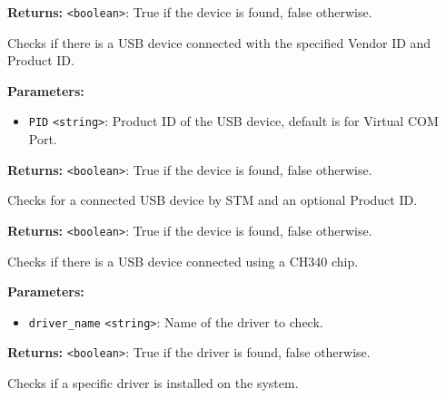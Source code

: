 \documentclass[12pt,a4paper]{article}
\begin{document}
\noindent \textbf{Returns:} \texttt{<boolean>}: True if the device is found, false otherwise.

\noindent Checks if there is a USB device connected with the specified Vendor ID and Product ID.

\vspace{5mm}
\noindent {}


\noindent \textbf{Parameters:}
\begin{itemize}
  \item \texttt{PID} \texttt{<string>}: Product ID of the USB device, default is for Virtual COM Port.
\end{itemize}

\noindent \textbf{Returns:} \texttt{<boolean>}: True if the device is found, false otherwise.

\noindent Checks for a connected USB device by STM and an optional Product ID.

\vspace{5mm}
\noindent {}


\noindent \textbf{Returns:} \texttt{<boolean>}: True if the device is found, false otherwise.

\noindent Checks if there is a USB device connected using a CH340 chip.

\vspace{5mm}
\noindent {}


\noindent \textbf{Parameters:}
\begin{itemize}
  \item \texttt{driver\_name} \texttt{<string>}: Name of the driver to check.
\end{itemize}

\noindent \textbf{Returns:} \texttt{<boolean>}: True if the driver is found, false otherwise.

\noindent Checks if a specific driver is installed on the system.

\vspace{5mm}
\noindent {}
\end{document}
